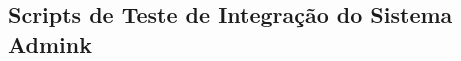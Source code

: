 \begin{apendicesenv}
\chapter{Scripts de Teste de Integração do Sistema Admink}
\label{chap:apendiceC}









\end{apendicesenv}





